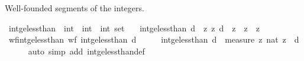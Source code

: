 \begin{isabellebody}
%
\endisadelimproof
%
\isadelimdocument
%
\endisadelimdocument
%
\isatagdocument
%
\isamarkuptrue%
%
\endisatagdocument
{\isafolddocument}%
%
\isadelimdocument
%
\endisadelimdocument
%
\begin{isamarkuptext}%
Well-founded segments of the integers.%
\end{isamarkuptext}\isamarkuptrue%
\isamarkupfalse%
\ int{\isacharunderscore}{\kern0pt}ge{\isacharunderscore}{\kern0pt}less{\isacharunderscore}{\kern0pt}than\ {\isacharcolon}{\kern0pt}{\isacharcolon}{\kern0pt}\ {\isachardoublequoteopen}int\ {\isasymRightarrow}\ {\isacharparenleft}{\kern0pt}int\ {\isasymtimes}\ int{\isacharparenright}{\kern0pt}\ set{\isachardoublequoteclose}\isanewline
\ \ \ {\isachardoublequoteopen}int{\isacharunderscore}{\kern0pt}ge{\isacharunderscore}{\kern0pt}less{\isacharunderscore}{\kern0pt}than\ d\ {\isacharequal}{\kern0pt}\ {\isacharbraceleft}{\kern0pt}{\isacharparenleft}{\kern0pt}z{\isacharprime}{\kern0pt}{\isacharcomma}{\kern0pt}\ z{\isacharparenright}{\kern0pt}{\isachardot}{\kern0pt}\ d\ {\isasymle}\ z{\isacharprime}{\kern0pt}\ {\isasymand}\ z{\isacharprime}{\kern0pt}\ {\isacharless}{\kern0pt}\ z{\isacharbraceright}{\kern0pt}{\isachardoublequoteclose}\isanewline
\isanewline
{}\isamarkupfalse%
\ wf{\isacharunderscore}{\kern0pt}int{\isacharunderscore}{\kern0pt}ge{\isacharunderscore}{\kern0pt}less{\isacharunderscore}{\kern0pt}than{\isacharcolon}{\kern0pt}\ {\isachardoublequoteopen}wf\ {\isacharparenleft}{\kern0pt}int{\isacharunderscore}{\kern0pt}ge{\isacharunderscore}{\kern0pt}less{\isacharunderscore}{\kern0pt}than\ d{\isacharparenright}{\kern0pt}{\isachardoublequoteclose}\isanewline
%
\isadelimproof
%
\endisadelimproof
%
\isatagproof
{}\isamarkupfalse%
\ {\isacharminus}{\kern0pt}\isanewline
\ \ \isamarkupfalse%
\ {\isachardoublequoteopen}int{\isacharunderscore}{\kern0pt}ge{\isacharunderscore}{\kern0pt}less{\isacharunderscore}{\kern0pt}than\ d\ {\isasymsubseteq}\ measure\ {\isacharparenleft}{\kern0pt}{\isasymlambda}z{\isachardot}{\kern0pt}\ nat\ {\isacharparenleft}{\kern0pt}z\ {\isacharminus}{\kern0pt}\ d{\isacharparenright}{\kern0pt}{\isacharparenright}{\kern0pt}{\isachardoublequoteclose}\isanewline
\ \ \ \ \isamarkupfalse%
\ {\isacharparenleft}{\kern0pt}auto\ simp\ add{\isacharcolon}{\kern0pt}\ int{\isacharunderscore}{\kern0pt}ge{\isacharunderscore}{\kern0pt}less{\isacharunderscore}{\kern0pt}than{\isacharunderscore}{\kern0pt}def{\isacharparenright}{\kern0pt}\isanewline

\end{isabellebody}
